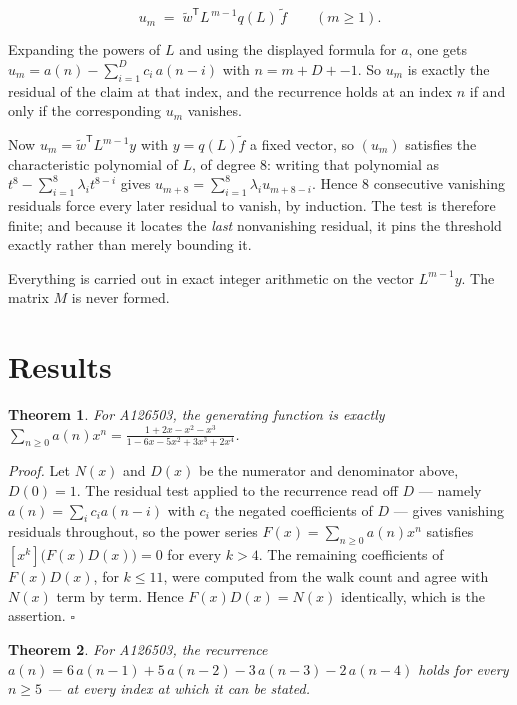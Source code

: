 \documentclass[11pt]{article}
\newtheorem{theorem}{Theorem}
\theoremstyle{definition}
\begin{document}
\[u_m \;=\; \tilde w^{\mathsf T} L^{\,m-1} q(L)\,\tilde f \qquad (m \ge 1).\]

Expanding the powers of $L$ and using the displayed formula for $a$, one gets $u_m = a(n) - \sum_{i=1}^{D} c_i\,a(n-i)$ with $n = m + D + -1$. So $u_m$ is exactly the residual of the claim at that index, and the recurrence holds at an index $n$ if and only if the corresponding $u_m$ vanishes.

Now $u_m = \tilde w^{\mathsf T} L^{m-1} y$ with $y = q(L)\tilde f$ a fixed vector, so $(u_m)$ satisfies the characteristic polynomial of $L$, of degree $8$: writing that polynomial as $t^{8} - \sum_{i=1}^{8} \lambda_i t^{8-i}$ gives $u_{m+8} = \sum_{i=1}^{8} \lambda_i u_{m+8-i}$. Hence $8$ consecutive vanishing residuals force every later residual to vanish, by induction. The test is therefore finite; and because it locates the {\itshape last} nonvanishing residual, it pins the threshold exactly rather than merely bounding it.

Everything is carried out in exact integer arithmetic on the vector $L^{m-1}y$. The matrix $M$ is never formed.

\section{Results}

\begin{theorem} For A126503, the generating function is exactly $\sum_{n\ge 0} a(n)x^n = \frac{1 + 2x - x^{2} - x^{3}}{1 - 6x - 5x^{2} + 3x^{3} + 2x^{4}}$.\end{theorem}

{\itshape Proof.} Let $N(x)$ and $D(x)$ be the numerator and denominator above, $D(0)=1$. The residual test applied to the recurrence read off $D$ --- namely $a(n) = \sum_i c_i a(n-i)$ with $c_i$ the negated coefficients of $D$ --- gives vanishing residuals throughout, so the power series $F(x)=\sum_{n\ge 0}a(n)x^n$ satisfies $[x^k]\bigl(F(x)D(x)\bigr) = 0$ for every $k > 4$. The remaining coefficients of $F(x)D(x)$, for $k \le 11$, were computed from the walk count and agree with $N(x)$ term by term. Hence $F(x)D(x) = N(x)$ identically, which is the assertion. $\square$

\begin{theorem} For A126503, the recurrence $a(n) = 6\,a(n-1) + 5\,a(n-2) - 3\,a(n-3) - 2\,a(n-4)$ holds for every $n \ge 5$ --- at every index at which it can be stated.\end{theorem}
\end{document}

